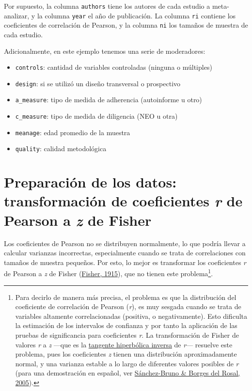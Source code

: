 \documentclass[
  bookmarksnumbered]{article}
\begin{document}
Por supuesto, la columna \texttt{authors} tiene los autores de cada estudio a meta-analizar, y la columna \texttt{year} el año de publicación. La columna \texttt{ri} contiene los coeficientes de correlación de Pearson, y la columna \texttt{ni} los tamaños de muestra de cada estudio.

Adicionalmente, en este ejemplo tenemos una serie de moderadores:

\begin{itemize}
\item
  \texttt{controls}: cantidad de variables controladas (ninguna o múltiples)
\item
  \texttt{design}: si se utilizó un diseño transversal o prospectivo
\item
  \texttt{a\_measure}: tipo de medida de adherencia (autoinforme u otro)
\item
  \texttt{c\_measure}: tipo de medida de diligencia (NEO u otra)
\item
  \texttt{meanage}: edad promedio de la muestra
\item
  \texttt{quality}: calidad metodológica
\end{itemize}

\hypertarget{preparaciuxf3n-de-los-datos-transformaciuxf3n-de-coeficientes-r-de-pearson-a-z-de-fisher}{%
\section{\texorpdfstring{Preparación de los datos: transformación de coeficientes \emph{r} de Pearson a \emph{z} de Fisher}{Preparación de los datos: transformación de coeficientes r de Pearson a z de Fisher}}\label{preparaciuxf3n-de-los-datos-transformaciuxf3n-de-coeficientes-r-de-pearson-a-z-de-fisher}}

Los coeficientes de Pearson no se distribuyen normalmente, lo que podría llevar a calcular varianzas incorrectas, especialmente cuando se trata de correlaciones con tamaños de muestra pequeños. Por esto, lo mejor es transformar los coeficientes \emph{r} de Pearson a \emph{z} de Fisher (\protect\hyperlink{ref-fisherFrequencyDistributionValues1915}{Fisher, 1915}), que no tienen este problema\footnote{Para decirlo de manera más precisa, el problema es que la distribución del coeficiente de correlación de Pearson (\emph{r}), es muy sesgada cuando se trata de variables altamente correlacionadas (positiva, o negativamente). Esto dificulta la estimación de los intervalos de confianza y por tanto la aplicación de las pruebas de significancia para coeficientes \emph{r}. La transformación de Fisher de valores \emph{r} a \emph{z} ---que es la \href{https://es.wikipedia.org/wiki/Tangente_hiperb\%C3\%B3lica}{tangente hiperbólica inversa} de \emph{r}--- resuelve este problema, pues los coeficientes \emph{z} tienen una distribución aproximadamente normal, y una varianza estable a lo largo de diferentes valores posibles de \emph{r} (para una demostración en español, ver \protect\hyperlink{ref-sanchez-brunoTransformacionFisherPara2005}{Sánchez-Bruno \& Borges del Rosal, 2005}).}.
\end{document}
